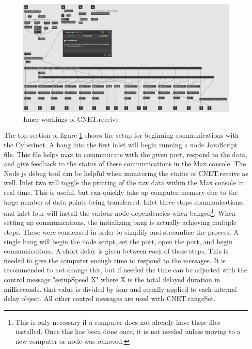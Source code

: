 \begin{center}
    \begin{figure}
        \centering
        \includegraphics[scale=0.48, angle=270]{diagrams/maxPatches/CNET.receive.png}
        \caption{Inner workings of CNET.receive}
        \label{fig:cnet.receive}
    \end{figure}
\end{center}

The top section of figure \ref{fig:cnet.receive} shows the setup for beginning communications with the Cyberinet. A bang into the first inlet will begin running a node JavaScript file. This file helps max to communicate with the given port, respond to the data, and give feedback to the status of these communications in the Max console. The Node js debug tool can be helpful when monitoring the status of CNET.receive as well. Inlet two will toggle the printing of the raw data within the Max console in real time. This is useful, but can quickly take up computer memory due to the large number of data points being transferred. Inlet three stops communications, and inlet four will install the various node dependencies when banged\footnote{This is only necessary if a computer does not already have these files installed. Once this has been done once, it is not needed unless moving to a new computer or node was removed.}. When setting up communications, the initializing bang is actually achieving multiple steps. These were condensed in order to simplify and streamline the process. A single bang will begin the node script, set the port, open the port, and begin communications. A short delay is given between each of these steps. This is needed to give the computer enough time to respond to the messages. It is recommended to not change this, but if needed the time can be adjusted with the control message "setupSpeed X" where X is the total delayed duration in milliseconds. that value is divided by four and equally applied to each internal delay object. All other control messages are used with CNET.rangeSet.

